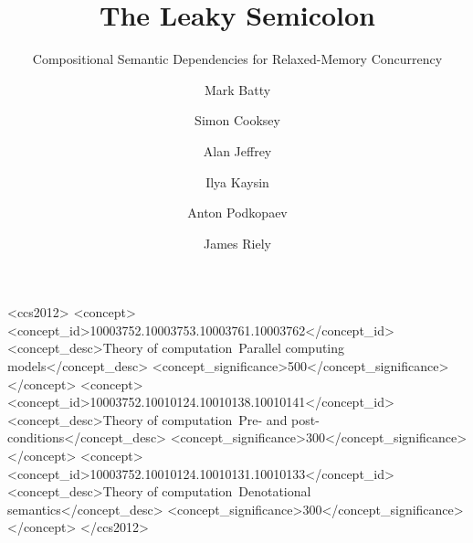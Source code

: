 \documentclass[acmsmall,screen,anonymous,review]{acmart}\settopmatter{printfolios=true}
\theoremstyle{acmdefinition}
\begin{document}
\title{The Leaky Semicolon}
\subtitle{Compositional Semantic Dependencies for Relaxed-Memory Concurrency}
\author{Mark Batty}

\author{Simon Cooksey}
\orcid{}

\author{Alan Jeffrey}

\author{Ilya Kaysin}
\orcid{}
\affiliation{
  \institution{}
  \city{}
  \country{}
}

\author{Anton Podkopaev}
\orcid{}
\affiliation{
  \institution{}
  \city{}
  \country{}
}

\author{James Riely}


\begin{abstract}

\end{abstract}

\begin{CCSXML}
<ccs2012>
   <concept>
       <concept_id>10003752.10003753.10003761.10003762</concept_id>
       <concept_desc>Theory of computation~Parallel computing models</concept_desc>
       <concept_significance>500</concept_significance>
       </concept>
   <concept>
       <concept_id>10003752.10010124.10010138.10010141</concept_id>
       <concept_desc>Theory of computation~Pre- and post-conditions</concept_desc>
       <concept_significance>300</concept_significance>
       </concept>
   <concept>
       <concept_id>10003752.10010124.10010131.10010133</concept_id>
       <concept_desc>Theory of computation~Denotational semantics</concept_desc>
       <concept_significance>300</concept_significance>
       </concept>
 </ccs2012>
\end{CCSXML}
\end{document}
